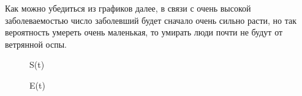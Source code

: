 \documentclass[11pt]{article}
\begin{document}
\begin{enumerate}
		 Как можно убедиться из графиков далее, в связи с очень высокой заболеваемостью число заболевший будет сначало очень сильно расти, но так вероятность умереть очень маленькая, то умирать люди почти не будут от ветрянной оспы.
		 \begin{figure}[h]
		 	\caption{S(t)}
		 	\label{fig:image4}
		 \end{figure}
	 \begin{figure}[h]
	 	\caption{E(t)}
	 	\label{fig:image5}
	 \end{figure}
 \begin{figure}[h]

\end{figure}
\end{enumerate}
\end{document}
